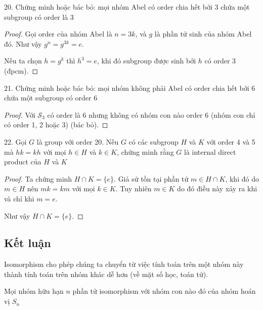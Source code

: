20. Chứng minh hoặc bác bỏ: mọi nhóm Abel có order chia hết bởi 3 chứa một subgroup có order là 3

\begin{proof}
    Gọi order của nhóm Abel là $n=3k$, và $g$ là phần tử sinh của nhóm Abel đó. Như vậy $g^n = g^{3k} = e$.

    Nếu ta chọn $h = g^k$ thì $h^3 = e$, khi đó subgroup được sinh bởi $h$ có order 3 (đpcm).
\end{proof}

21. Chứng minh hoặc bác bỏ: mọi nhóm không phải Abel có order chia hết bởi 6 chứa một subgroup có order 6

\begin{proof}
    Với $\mathcal{S}_3$ có order là 6 nhưng không có nhóm con nào order 6 (nhóm con chỉ có order 1, 2 hoặc 3) (bác bỏ).
\end{proof}

22. Gọi $G$ là group với order 20. Nếu $G$ có các subgroup $H$ và $K$ với order 4 và 5 mà $hk=kh$ với mọi $h \in H$ và $k \in K$, chứng minh rằng $G$ là internal direct product của $H$ và $K$

\begin{proof}
    Ta chứng minh $H \cap K = \{ e \}$. Giả sử tồn tại phần tử $m \in H \cap K$, khi đó do $m \in H$ nên $mk = km$ với mọi $k \in K$. Tuy nhiên $m \in K$ do đó điều này xảy ra khi và chỉ khi $m = e$.

    Như vậy $H \cap K = \{ e \}$.
\end{proof}

\subsection{Kết luận}

Isomorphism cho phép chúng ta chuyển từ việc tính toán trên một nhóm này thành tính toán trên nhóm khác dễ hơn (về mặt số học, toán tử).

\begin{theorem}
    Mọi nhóm hữu hạn $n$ phần tử isomorphism với nhóm con nào đó của nhóm hoán vị $S_n$
\end{theorem}